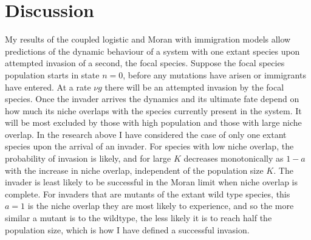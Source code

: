 \section{Discussion}

\iffalse
In the research presented above, even though not all species are equal to each other, their interactions have been symmetric. %
That is, no species has been given an explicit fitness advantage. 
The complete neutrality of Hubbell comes when the species not only interact with each other symmetrically but also interact with other species as strongly as they interact with themselves. 
\fi

My results of the coupled logistic and Moran with immigration models allow predictions of the dynamic behaviour of a system with one extant species upon attempted invasion of a second, the focal species. 
Suppose the focal species population starts in state $n=0$, before any mutations have arisen or immigrants have entered.  
At a rate $\nu g$ there will be an attempted invasion by the focal species. 
Once the invader arrives the dynamics and its ultimate fate depend on how much its niche overlaps with the species currently present in the system. 
It will be most excluded by those with high population and those with large niche overlap. 
In the research above I have considered the case of only one extant species upon the arrival of an invader. 
For species with low niche overlap, the probability of invasion is likely, and for large $K$ decreases monotonically as $1-a$ with the increase in niche overlap, independent of the population size $K$. %
The invader is least likely to be successful in the Moran limit when niche overlap is complete. 
For invaders that are mutants of the extant wild type species, this $a=1$ is the niche overlap they are most likely to experience, and so the more similar a mutant is to the wildtype, the less likely it is to reach half the population size, which is how I have defined a successful invasion. 

